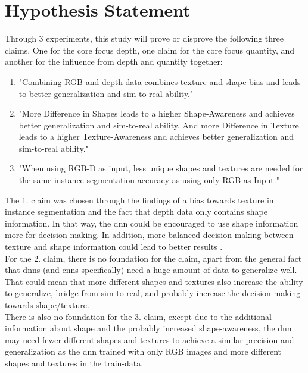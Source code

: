 	\section{Hypothesis Statement}
	\label{sec:hypothesis-statement}	
		Through 3 experiments, this study will prove or disprove the following three claims. One for the core focus depth, one claim for the core focus quantity, and another for the influence from depth and quantity together: 
		\begin{enumerate}
			\item "Combining RGB and depth data combines texture and shape bias and leads to better generalization and sim-to-real ability." %
			\item "More Difference in Shapes leads to a higher Shape-Awareness and achieves better generalization and sim-to-real ability. And more Difference in Texture leads to a higher Texture-Awareness and achieves better generalization and sim-to-real ability."
			\item "When using RGB-D as input, less unique shapes and textures are needed for the same instance segmentation accuracy as using only RGB as Input."
		\end{enumerate}
		The 1. claim was chosen through the findings of a bias towards texture in instance segmentation \cite{Theodoridis2022} and the fact that depth data only contains shape information. In that way, the \ac{dnn} could be encouraged to use shape information more for decision-making. In addition, more balanced decision-making between texture and shape information could lead to better results \cite{Li2021}\cite{Co2021}\cite{Chung2023}.\\
		For the 2. claim, there is no foundation for the claim, apart from the general fact that \ac{dnn}s (and \ac{cnn}s specifically) need a huge amount of data to generalize well. That could mean that more different shapes and textures also increase the ability to generalize, bridge from sim to real, and probably increase the decision-making towards shape/texture.\\
		There is also no foundation for the 3. claim, except due to the additional information about shape and the probably increased shape-awareness, the \ac{dnn} may need fewer different shapes and textures to achieve a similar precision and generalization as the \ac{dnn} trained with only RGB images and more different shapes and textures in the train-data.
	
	



			